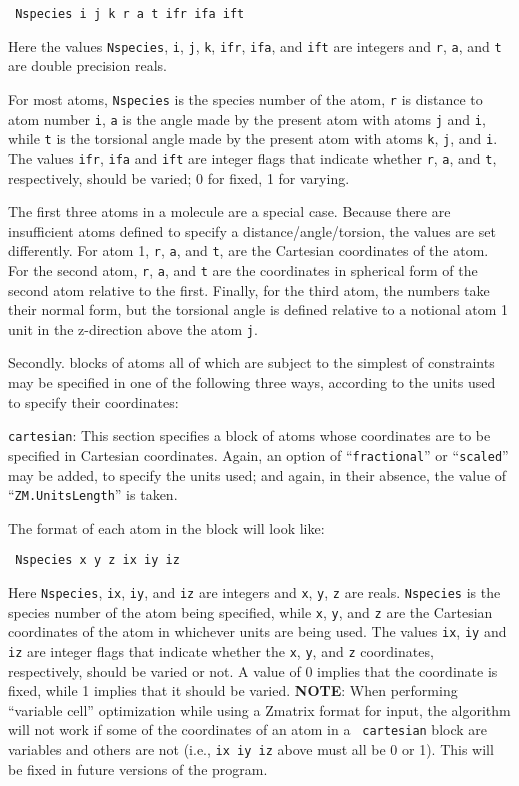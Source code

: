 \documentclass[11pt]{article}
\begin{document}
\begin{description}
\noindent\texttt{    Nspecies i j k r a t ifr ifa ift}

Here the values \texttt{Nspecies}, \texttt{i}, \texttt{j}, \texttt{k},
\texttt{ifr}, \texttt{ifa}, and \texttt{ift} are integers and
\texttt{r}, \texttt{a}, and \texttt{t} are double precision reals.

For most atoms, \texttt{Nspecies} is the species number of the atom,
\texttt{r} is distance to atom number \texttt{i}, \texttt{a} is the
angle made by the present atom with atoms \texttt{j} and \texttt{i},
while \texttt{t} is the torsional angle made by the present atom with
atoms \texttt{k}, \texttt{j}, and \texttt{i}. The values \texttt{ifr},
\texttt{ifa} and \texttt{ift} are integer flags that indicate whether
\texttt{r}, \texttt{a}, and \texttt{t}, respectively, should be
varied; 0 for fixed, 1 for varying.


The first three atoms in a molecule are a special case. Because there
are insufficient atoms defined to specify a distance/angle/torsion,
the values are set differently. For atom 1, \texttt{r}, \texttt{a},
and \texttt{t}, are the Cartesian coordinates of the atom.  For the
second atom, \texttt{r}, \texttt{a}, and \texttt{t} are the
coordinates in spherical form of the second atom relative to the
first. Finally, for the third atom, the numbers take their normal
form, but the torsional angle is defined relative to a notional atom 1
unit in the z-direction above the atom \texttt{j}.

Secondly. blocks of atoms all of which are subject to the simplest of
constraints may be specified in one of the following three ways,
according to the units used to specify their coordinates:


\item \texttt{cartesian}: This section specifies a block of atoms
whose coordinates are to be specified in Cartesian coordinates. Again,
an option of ``\texttt{fractional}'' or ``\texttt{scaled}'' may be
added, to specify the units used; and again, in their absence, the
value of ``\texttt{ZM.UnitsLength}'' is taken.

The format of each atom in the block will look like:

\noindent\texttt{      Nspecies x y z ix iy iz}

Here \texttt{Nspecies}, \texttt{ix}, \texttt{iy}, and \texttt{iz} are
integers and \texttt{x}, \texttt{y}, \texttt{z} are
reals. \texttt{Nspecies} is the species number of the atom being
specified, while \texttt{x}, \texttt{y}, and \texttt{z} are the
Cartesian coordinates of the atom in whichever units are being
used. The values \texttt{ix}, \texttt{iy} and \texttt{iz} are integer
flags that indicate whether the \texttt{x}, \texttt{y}, and \texttt{z}
coordinates, respectively, should be varied or not. A value of 0
implies that the coordinate is fixed, while 1 implies that it should
be varied.  {\bf NOTE}: When performing ``variable cell''
optimization while using a Zmatrix format for input, the algorithm
will not work if some of the coordinates of an atom in a {\tt
cartesian} block are variables and others are not (i.e.,
\texttt{ix iy iz} above must all be 0 or 1). This will be fixed in
future versions of the program.


\end{description}
\end{document}

